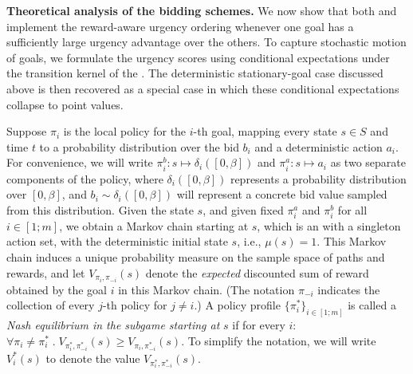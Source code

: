 \smallskip
\noindent\textbf{Theoretical analysis of the bidding schemes.}
We now show that both \poorman and \allpay implement the reward-aware urgency ordering whenever one goal has a sufficiently large urgency advantage over the others.
To capture stochastic motion of goals, we formulate the urgency scores using conditional expectations under the transition kernel of the \momdp.
The deterministic stationary-goal case discussed above is then recovered as a special case in which these conditional expectations collapse to point values.

Suppose $\pi_i$ is the local policy for the $i$-th goal, mapping every state $s\in S$ and time $t$ to a probability distribution over the bid $b_i$ and a deterministic action $a_i$.
For convenience, we will write $\pi_i^b\colon s\mapsto \delta_i([0,\beta])$ and $\pi_i^a\colon s\mapsto a_i$ as two separate components of the policy, where $\delta_i([0,\beta])$ represents a probability distribution over $[0,\beta]$, and $b_i\sim \delta_i([0,\beta])$ will represent a concrete bid value sampled from this distribution.
Given the state $s$, and given fixed $\pi_i^a$ and $\pi_i^b$ for all $i\in [1;m]$, we obtain a Markov chain starting at $s$, which is an \momdp with a singleton action set, with the deterministic initial state $s$, i.e., $\mu(s)=1$.
This Markov chain induces a unique probability measure on the sample space of paths and rewards, and let $V_{\pi_i,\pi_{-i}}(s)$ denote the \textit{expected} discounted sum of reward obtained by the goal $i$ in this Markov chain.
(The notation $\pi_{-i}$ indicates the collection of every $j$-th policy for $j\neq i$.)
A policy profile $\{\pi^*_i\}_{i\in [1;m]}$ is called a \textit{Nash equilibrium in the subgame starting at} $s$ if for every $i$:
$	
\forall \pi_i\neq \pi^*_i\;.\;V_{\pi^*_i,\pi^*_{-i}}(s) \geq V_{\pi_i,\pi^*_{-i}}(s).
$
To simplify the notation, we will write $V_i^*(s)$ to denote the value $V_{\pi^*_i,\pi^*_{-i}}(s)$.

